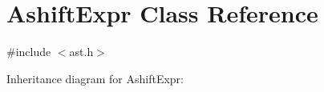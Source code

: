 \hypertarget{class_ashift_expr}{}\section{Ashift\+Expr Class Reference}
\label{class_ashift_expr}


{\ttfamily \#include $<$ast.\+h$>$}



Inheritance diagram for Ashift\+Expr\+:

